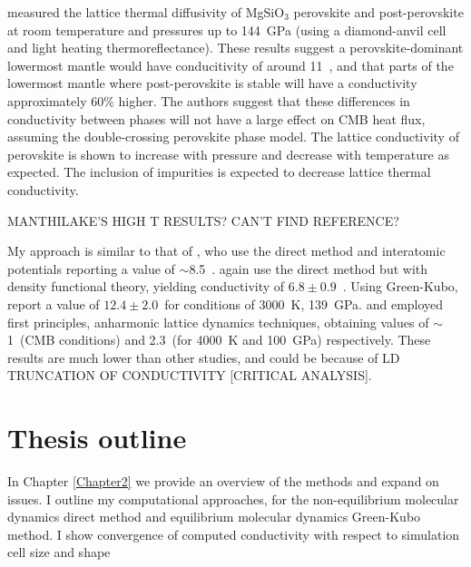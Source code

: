 \citet{Ohta2012} measured the lattice thermal diffusivity of MgSiO$_3$ perovskite and post-perovskite at room temperature and pressures up to 144~GPa (using a diamond-anvil cell and light heating thermoreflectance). These results suggest a perovskite-dominant lowermost mantle would have conducitivity of around 11~\wmk, and that parts of the lowermost mantle where post-perovskite is stable will have a conductivity approximately 60\% higher. The authors suggest that these differences in conductivity between phases will not have a large effect on CMB heat flux, assuming the double-crossing perovskite phase model. The lattice conductivity of \mgsios perovskite is shown to increase with pressure and decrease with temperature as expected. The inclusion of impurities is expected to decrease lattice thermal conductivity.

MANTHILAKE'S HIGH T RESULTS? CAN'T FIND REFERENCE?

My approach is similar to that of \citet{Ammann2014}, who use the direct method and interatomic potentials reporting a value of $\sim$8.5~\wmk. \citet{Stackhouse2015} again use the direct method but with density functional theory, yielding conductivity of $6.8\pm0.9$~\wmk. Using Green-Kubo, \citet{Haigis2013} report a value of $12.4\pm2.0$~\wmks for conditions of 3000~K, 139~GPa. \citet{Tang2014} and \citet{Dekura2013} employed first principles, anharmonic lattice dynamics techniques, obtaining values of $\sim$1~\wmks (CMB conditions) and 2.3~\wmks (for 4000~K and 100~GPa) respectively. These results are much lower than other studies, and could be because of LD TRUNCATION OF CONDUCTIVITY [CRITICAL ANALYSIS].

















\section{Thesis outline}
In Chapter \ref{Chapter2} we provide an overview of the methods and expand on issues. I outline my computational approaches, for the non-equilibrium molecular dynamics direct method and equilibrium molecular dynamics Green-Kubo method. I show convergence of computed conductivity with respect to simulation cell size and shape 


